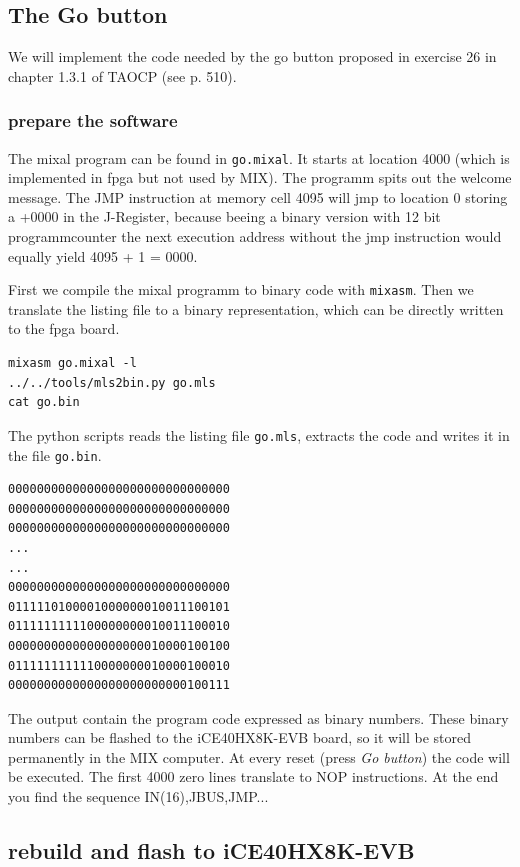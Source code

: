 \documentclass[a4paper,ngerman]{scrartcl}
\begin{document}
\subsection{The Go button}
We will implement the code needed by the go button proposed in  exercise 26 in chapter 1.3.1 of TAOCP (see p. 510).

\subsubsection{prepare the software}
The mixal program can be found in \lstinline|go.mixal|. It starts at location 4000 (which is implemented in fpga but not used by MIX). The programm spits out the welcome message. The JMP instruction at memory cell 4095 will jmp to location 0 storing a +0000 in the J-Register, because beeing a binary version with 12 bit programmcounter the next execution address without the jmp instruction would equally yield 4095 + 1 = 0000.




First we compile the mixal programm to binary code with \lstinline|mixasm|. Then we translate the listing file to a binary representation, which can be directly written to the fpga board.

\begin{lstlisting}[numbers=none,frame=none]
mixasm go.mixal -l
../../tools/mls2bin.py go.mls
cat go.bin
\end{lstlisting}

The python scripts reads the listing file \lstinline|go.mls|, extracts the code and writes it in the file \lstinline|go.bin|.

\begin{lstlisting}
0000000000000000000000000000000
0000000000000000000000000000000
0000000000000000000000000000000
...
...
0000000000000000000000000000000
0111110100001000000010011100101
0111111111100000000010011100010
0000000000000000000010000100100
0111111111110000000010000100010
0000000000000000000000000100111
\end{lstlisting}

The output contain the program code expressed as binary numbers. These binary numbers can be flashed to the iCE40HX8K-EVB board, so it will be stored permanently in the MIX computer. At every reset (press \textit{Go button}) the code will be executed. The first 4000 zero lines translate to NOP instructions. At the end you find the sequence IN(16),JBUS,JMP...

\subsection{rebuild and flash to iCE40HX8K-EVB}
\end{document}
